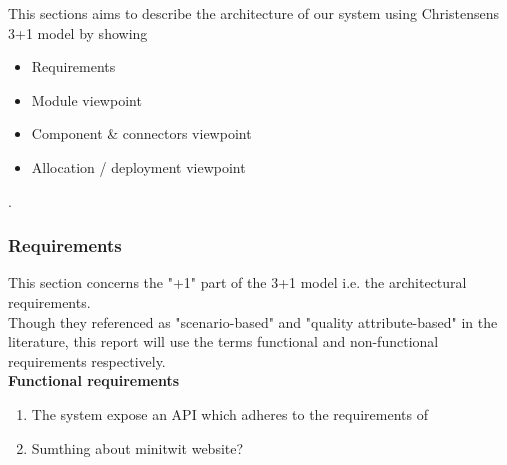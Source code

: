 This sections aims to describe the architecture of our system using Christensens 3+1 model \cite{architecturemodel} by showing
\begin{itemize}
    \item Requirements
    \item Module viewpoint 
    \item Component \& connectors viewpoint 
    \item Allocation / deployment viewpoint
\end{itemize}.
    
\subsubsection{Requirements}    
This section concerns the "+1" part of the 3+1 model i.e. the architectural requirements. \\
Though they referenced as "scenario-based" and "quality attribute-based" in the literature, this 
report will use the terms functional and non-functional requirements respectively. \\

\noindent
\textbf{Functional requirements}
\begin{enumerate}
    \item The system expose an API which adheres to the requirements of \cite{apispec} 
    \item Sumthing about minitwit website?
\end{enumerate} 

